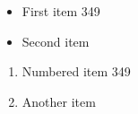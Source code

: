 \documentclass{article}
\begin{document}
\begin{itemize}
\item First item 349
\item Second item
\end{itemize}
\begin{enumerate}
\item Numbered item 349
\item Another item
\end{enumerate}
\end{document}
